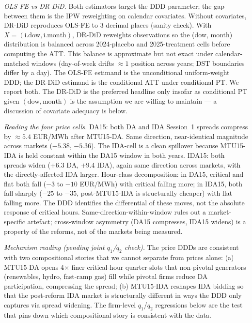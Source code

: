 \documentclass[11pt,a4paper]{article}
\begin{document}
\textit{OLS-FE vs DR-DiD.} Both estimators target the DDD parameter; the gap between them is the IPW reweighting on calendar covariates. Without covariates, DR-DiD reproduces OLS-FE to 3 decimal places (sanity check). With $X = (\text{i.dow}, \text{i.month})$, DR-DiD reweights observations so the (dow, month) distribution is balanced across 2024-placebo and 2025-treatment cells before computing the ATT. This balance is approximate but not exact under calendar-matched windows (day-of-week drifts $\approx 1$ position across years; DST boundaries differ by a day). The OLS-FE estimand is the unconditional uniform-weight DDD; the DR-DiD estimand is the conditional ATT under conditional PT. We report both. The DR-DiD is the preferred headline only insofar as conditional PT given $(\text{dow}, \text{month})$ is the assumption we are willing to maintain --- a discussion of covariate adequacy is below.

\textit{Reading the four price cells.}
DA15: both DA and IDA Session~1 spreads compress by $\approx 5.4$ EUR/MWh after MTU15-DA. Same direction, near-identical magnitude across markets ($-5.38$, $-5.36$). The IDA-cell is a clean spillover because MTU15-IDA is held constant within the DA15 window in both years. IDA15: both spreads widen ($+6.3$ DA, $+9.4$ IDA), again same direction across markets, with the directly-affected IDA larger. Hour-class decomposition: in DA15, critical and flat both fall ($-3$ to $-10$ EUR/MWh) with critical falling more; in IDA15, both fall sharply ($-25$ to $-35$, post-MTU15-IDA is structurally cheaper) with flat falling more. The DDD identifies the differential of these moves, not the absolute response of critical hours. Same-direction-within-window rules out a market-specific artefact; cross-window asymmetry (DA15 compresses, IDA15 widens) is a property of the reforms, not of the markets being measured.

\textit{Mechanism reading (pending joint $q_1$/$q_2$ check).}
The price DDDs are consistent with two compositional stories that we cannot separate from prices alone: (a) MTU15-DA opens 4$\times$ finer critical-hour quarter-slots that non-pivotal generators (renewables, hydro, fast-ramp gas) fill while pivotal firms reduce DA participation, compressing the spread; (b) MTU15-IDA reshapes IDA bidding so that the post-reform IDA market is structurally different in ways the DDD only captures via spread widening. The firm-level $q_1$/$q_2$ regressions below are the test that pins down which compositional story is consistent with the data.
\end{document}
